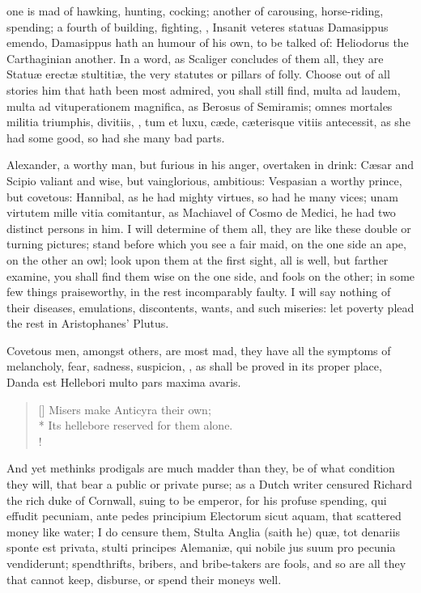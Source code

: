 {one is mad of hawking, hunting, cocking; another of carousing,
horse-riding, spending; a fourth of building, fighting, \etc{}, Insanit
veteres statuas Damasippus emendo, Damasippus hath an humour of his
own, to be talked of: Heliodorus the Carthaginian another. In a
word, as Scaliger concludes of them all, they are Statu\ae{} erect\ae{}
stultiti\ae{}, the very statutes or pillars of folly. Choose out of all
stories him that hath been most admired, you shall still find, multa ad
laudem, multa ad vituperationem magnifica, as Berosus of
Semiramis; omnes mortales militia triumphis, divitiis, \etc{}, tum et
luxu, c\ae{}de, c\ae{}terisque vitiis antecessit, as she had some good, so
had she many bad parts.

Alexander, a worthy man, but furious in his anger, overtaken in drink:
C\ae{}sar and Scipio valiant and wise, but vainglorious, ambitious:
Vespasian a worthy prince, but covetous: Hannibal, as he had
mighty virtues, so had he many vices; unam virtutem mille vitia
comitantur, as Machiavel of Cosmo de Medici, he had two distinct
persons in him. I will determine of them all, they are like these
double or turning pictures; stand before which you see a fair maid, on
the one side an ape, on the other an owl; look upon them at the first
sight, all is well, but farther examine, you shall find them wise on
the one side, and fools on the other; in some few things praiseworthy,
in the rest incomparably faulty. I will say nothing of their diseases,
emulations, discontents, wants, and such miseries: let poverty plead
the rest in Aristophanes' Plutus.

Covetous men, amongst others, are most mad, they have all the
symptoms of melancholy, fear, sadness, suspicion, \etc{}, as shall be
proved in its proper place,
Danda est Hellebori multo pars maxima avaris.

\settowidth{\versewidth}{Its hellebore reserved for them alone.}
\begin{verse}[\versewidth]
Misers make Anticyra their own;\\*
Its hellebore reserved for them alone.\\!
\end{verse}

And yet methinks prodigals are much madder than they, be of what
condition they will, that bear a public or private purse; as a
Dutch writer censured Richard the rich duke of Cornwall, suing to
be emperor, for his profuse spending, qui effudit pecuniam, ante pedes
principium Electorum sicut aquam, that scattered money like water; I do
censure them, Stulta Anglia (saith he) qu\ae{}, tot denariis sponte est
privata, stulti principes Alemani\ae{}, qui nobile jus suum pro pecunia
vendiderunt; spendthrifts, bribers, and bribe-takers are fools, and so
are all they that cannot keep, disburse, or spend their moneys
well.

}
